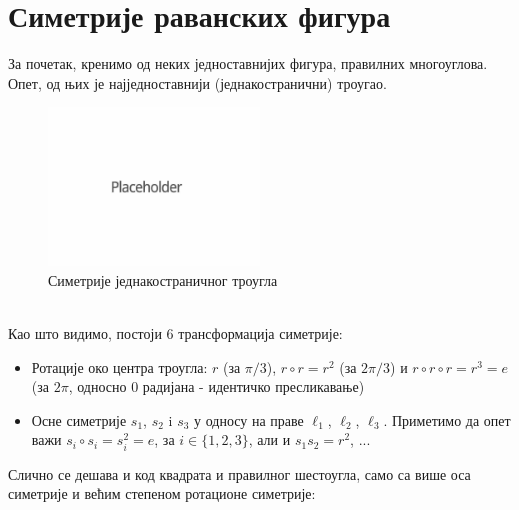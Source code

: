 \documentclass{report}
\theoremstyle{plain}
\theoremstyle{definition}
\begin{document}
\section{Симетрије раванских фигура}
За почетак, кренимо од неких једноставнијих фигура, правилних многоуглова. Опет, од њих је најједноставнији (једнакостранични) троугао.\\
\begin{figure}[h]
\centering
\includegraphics[width=0.5\textwidth]{placeholder}
\caption{Симетрије једнакостраничног троугла}
\end{figure}\\
Као што видимо, постоји 6 трансформација симетрије: \begin{itemize}
                                                         \item Ротације око центра троугла: $r$ (за $\pi/3$), $r\circ r = r^2$ (за $2\pi/3$) и $r\circ r \circ r = r^3 = e$ (за $2\pi$, односно $0$ радијана - идентичко пресликавање)
                                                         \item Осне симетрије $s_1$, $s_2$ i $s_3$ у односу на праве $\ell_1$, $\ell_2$, $\ell_3$. Приметимо да опет важи $s_i \circ s_i = s_i^2 = e$, за $i\in \lbrace 1, 2, 3 \rbrace$, али и $s_1 s_2 = r^2$, ...
                                                       \end{itemize}
Слично се дешава и код квадрата и правилног шестоугла, само са више оса симетрије и већим степеном ротационе симетрије:\\
\end{document}
